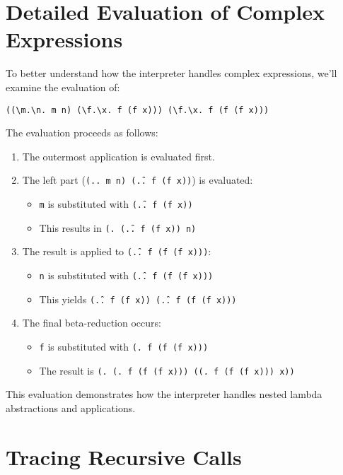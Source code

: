 \section{Detailed Evaluation of Complex Expressions}

To better understand how the interpreter handles complex expressions, we'll examine the evaluation of:

\begin{verbatim}
((\m.\n. m n) (\f.\x. f (f x))) (\f.\x. f (f (f x)))
\end{verbatim}

The evaluation proceeds as follows:

\begin{enumerate}
    \item The outermost application is evaluated first.
    \item The left part (\texttt{(\m.\n. m n) (\f.\x. f (f x))}) is evaluated:
        \begin{itemize}
            \item \texttt{m} is substituted with \texttt{(\f.\x. f (f x))}
            \item This results in \texttt{(\n. (\f.\x. f (f x)) n)}
        \end{itemize}
    \item The result is applied to \texttt{(\f.\x. f (f (f x)))}:
        \begin{itemize}
            \item \texttt{n} is substituted with \texttt{(\f.\x. f (f (f x)))}
            \item This yields \texttt{(\f.\x. f (f x)) (\f.\x. f (f (f x)))}
        \end{itemize}
    \item The final beta-reduction occurs:
        \begin{itemize}
            \item \texttt{f} is substituted with \texttt{(\x. f (f (f x)))}
            \item The result is \texttt{(\x. (\x. f (f (f x))) ((\x. f (f (f x))) x))}
        \end{itemize}
\end{enumerate}

This evaluation demonstrates how the interpreter handles nested lambda abstractions and applications.

\section{Tracing Recursive Calls}


